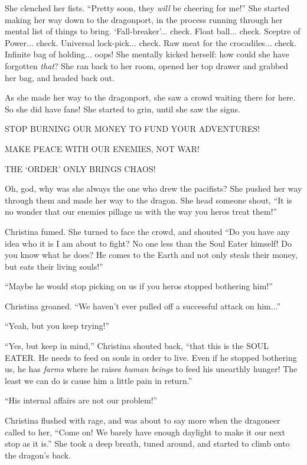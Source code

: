 \documentclass[showtrims,b6paper,draft,10pt]{memoir}
\begin{document}
She clenched her fists.  ``Pretty soon, they \emph{will} be cheering for me!''  She started making her way down to the dragonport, in the process running through her mental list of things to bring.  `Fall-breaker'... check.  Float ball... check.  Sceptre of Power... check.  Universal lock-pick... check.  Raw meat for the crocadiles... check.  Infinite bag of holding... oops!  She mentally kicked herself:  how could she have forgotten \emph{that}?  She ran back to her room, opened her top drawer and grabbed her bag, and headed back out.

As she made her way to the dragonport, she saw a crowd waiting there for here.  So she did have fans!  She started to grin, until she saw the signs.

STOP BURNING OUR MONEY TO FUND YOUR ADVENTURES!

MAKE PEACE WITH OUR ENEMIES, NOT WAR!

THE `ORDER' ONLY BRINGS CHAOS!

Oh, god, why was she always the one who drew the pacifists?  She pushed her way through them and made her way to the dragon.  She head someone shout,  ``It is no wonder that our enemies pillage us with the way you heros treat them!''

Christina fumed.  She turned to face the crowd, and shouted ``Do you have any idea who it is I am about to fight?  No one less than the Soul Eater himself!  Do you know what he does?  He comes to the Earth and not only steals their money, but eats their living souls!''

``Maybe he would stop picking on us if you heros stopped bothering him!''

Christina groaned.  ``We haven't ever pulled off a successful attack on him...''

``Yeah, but you keep trying!''

``Yes, but keep in mind,''  Christina shouted back, ``that this is the SOUL EATER.  He needs to feed on souls in order to live.  Even if he stopped bothering us, he has \emph{farms} where he raises \emph{human beings} to feed his unearthly hunger!  The least we can do is cause him a little pain in return.''

``His internal affairs are not our problem!''

Christina flushed with rage, and was about to say more when the dragoneer called to her, ``Come on!  We barely have enough daylight to make it our next stop as it is.''  She took a deep breath, tuned around, and started to climb onto the dragon's back.
\end{document}
